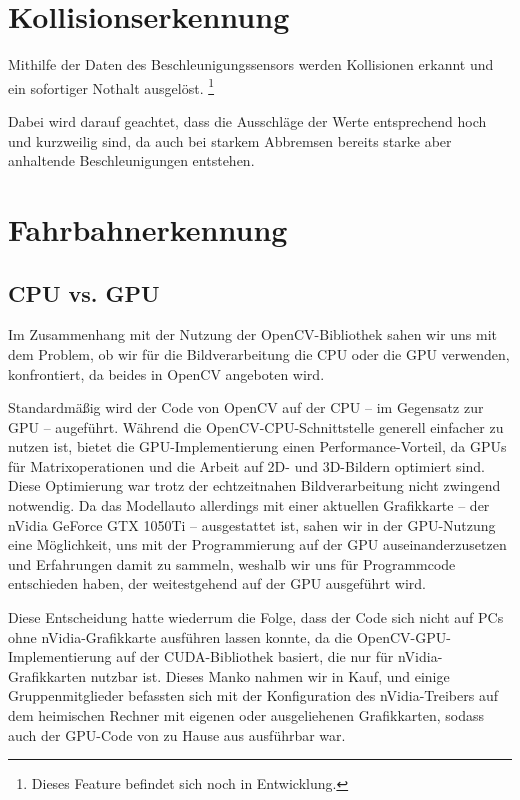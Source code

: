 \documentclass[a4paper,12pt]{report}
\begin{document}
	
	

\chapter{Kollisionserkennung}

	Mithilfe der Daten des Beschleunigungssensors werden Kollisionen erkannt und ein sofortiger Nothalt ausgelöst.
	\footnote{Dieses Feature befindet sich noch in Entwicklung.}
	
	Dabei wird darauf geachtet, dass die Ausschläge der Werte entsprechend hoch und kurzweilig sind, da auch bei starkem Abbremsen bereits starke aber anhaltende Beschleunigungen entstehen.
	

\chapter{Fahrbahnerkennung}


\section{CPU vs. GPU}
Im Zusammenhang mit der Nutzung der OpenCV-Bibliothek sahen wir uns mit dem Problem, ob wir für die Bildverarbeitung die CPU oder die GPU verwenden, konfrontiert, da beides in OpenCV angeboten wird.

Standardmäßig wird der Code von OpenCV auf der CPU -- im Gegensatz zur GPU -- augeführt.
Während die OpenCV-CPU-Schnittstelle generell einfacher zu nutzen ist, bietet die GPU-Implementierung einen Performance-Vorteil, da GPUs für Matrixoperationen und die Arbeit auf 2D- und 3D-Bildern optimiert sind.
Diese Optimierung war trotz der echtzeitnahen Bildverarbeitung nicht zwingend notwendig.
Da das Modellauto allerdings mit einer aktuellen Grafikkarte -- der nVidia GeForce GTX 1050Ti -- ausgestattet ist, sahen wir in der GPU-Nutzung eine Möglichkeit, uns mit der Programmierung auf der GPU auseinanderzusetzen und Erfahrungen damit zu sammeln, weshalb wir uns für Programmcode entschieden haben, der weitestgehend auf der GPU ausgeführt wird.

Diese Entscheidung hatte wiederrum die Folge, dass der Code sich nicht auf PCs ohne nVidia-Grafikkarte ausführen lassen konnte, da die OpenCV-GPU-Implementierung auf der CUDA-Bibliothek basiert, die nur für nVidia-Grafikkarten nutzbar ist.
Dieses Manko nahmen wir in Kauf, und einige Gruppenmitglieder befassten sich mit der Konfiguration des nVidia-Treibers auf dem heimischen Rechner mit eigenen oder ausgeliehenen Grafikkarten, sodass auch der GPU-Code von zu Hause aus ausführbar war.
\end{document}
